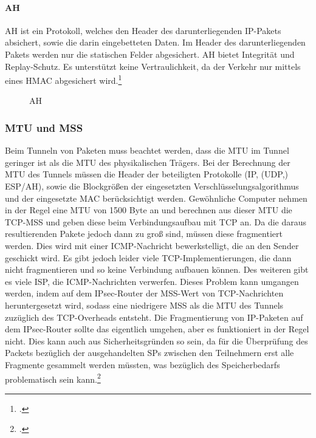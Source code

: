 \paragraph{AH}
\ac{AH} ist ein Protokoll, welches den Header des darunterliegenden \ac{IP}-Pakets absichert,
sowie die darin eingebetteten Daten. Im Header des darunterliegenden Pakets werden nur die statischen Felder
abgesichert. \ac{AH} bietet Integrität und Replay-Schutz. Es unterstützt keine Vertraulichkeit, da
der Verkehr nur mittels eines \ac{HMAC} abgesichert wird.\footcite[][]{stephen_kent_rfc_2005-1}
\begin{figure}[h!]
    \label{fig:AH}
    \centering
    \def\svgwidth{\columnwidth}
    
    \caption{\ac{AH}}
\end{figure}

\subsubsection{MTU und MSS}
Beim Tunneln von Paketen muss beachtet werden, dass die \ac{MTU} im Tunnel geringer
ist als die \ac{MTU} des physikalischen Trägers. Bei der Berechnung der \ac{MTU} des Tunnels müssen
die Header der beteiligten Protokolle (\ac{IP}, (\ac{UDP},) \ac{ESP}/\ac{AH}),
sowie die Blockgrößen der eingesetzten Verschlüsselungsalgorithmus und der eingesetzte \ac{MAC}
berücksichtigt werden.
Gewöhnliche Computer nehmen in der Regel eine \ac{MTU} von 1500 Byte an und 
berechnen aus dieser \ac{MTU} die TCP-\ac{MSS} und geben diese beim Verbindungsaufbau mit \ac{TCP}
an. Da die daraus resultierenden Pakete jedoch dann zu groß sind, müssen diese fragmentiert werden.
Dies wird mit einer \ac{ICMP}-Nachricht bewerkstelligt, die an den Sender geschickt wird.
Es gibt jedoch leider viele \ac{TCP}-Implementierungen, die dann nicht fragmentieren und so
keine Verbindung aufbauen können. Des weiteren gibt es viele \ac{ISP}, die ICMP-Nachrichten
verwerfen. Dieses Problem kann umgangen werden, indem auf dem \ac{IPsec}-Router
der \ac{MSS}-Wert von \ac{TCP}-Nachrichten heruntergesetzt wird, sodass eine niedrigere
\ac{MSS} als die \ac{MTU} des Tunnels zuzüglich des \ac{TCP}-Overheads entsteht.
Die Fragmentierung von \ac{IP}-Paketen auf dem \ac{IPsec}-Router sollte das eigentlich umgehen,
aber es funktioniert in der Regel nicht. Dies kann auch aus Sicherheitsgründen so sein,
da für die Überprüfung des Packets bezüglich der ausgehandelten \acp{SP} zwischen den Teilnehmern
erst alle Fragmente gesammelt werden müssten, was bezüglich des Speicherbedarfs problematisch sein kann.\footcite[][Kapitel 3.4 Inbound Packet Processing]{stephen_kent_rfc_2005-2}

